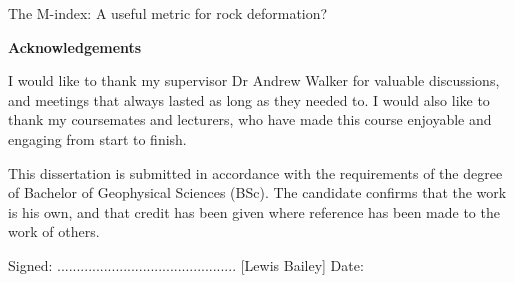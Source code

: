 \documentclass[a4paper,12pt,twoside]{report}
\numberwithin{equation}{chapter}
\begin{document}

%
%
%
%
%
%


\vspace{3cm}
\begin{center}
{\huge The M-index: A useful metric for rock deformation?}
\vspace{3cm}

\begin{Large}
\textbf{Acknowledgements}
\end{Large}

I would like to thank my supervisor Dr Andrew Walker for valuable discussions, and meetings that always lasted as long as they needed to. I would also like to thank my coursemates and lecturers, who have made this course enjoyable and engaging from start to finish.
  
\vspace{3cm}
\noindent
\begin{Large}
\end{Large}

This dissertation is submitted in accordance with the requirements of the degree of Bachelor of Geophysical Sciences (BSc). The candidate confirms that the work is his own, and that credit has been given where reference has been made to the work of others. 


\vspace{1cm}
\noindent
Signed: .............................................. [Lewis Bailey] Date: 

\end{center}
\end{document}
